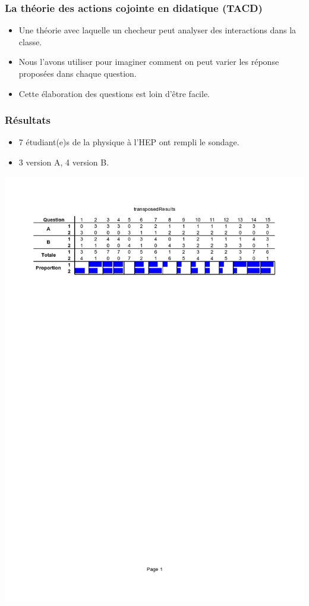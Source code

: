 \documentclass{beamer}
\begin{document}
\begin{frame}
  \frametitle{La théorie des actions cojointe en didatique (TACD)}
  \begin{itemize}
    \item Une théorie avec laquelle un checheur peut analyser des interactions
      dans la classe.
    \item Nous l'avons utiliser pour imaginer comment on peut varier
      les réponse proposées dans chaque question.
      \item Cette élaboration des questions est loin d'être facile.
    \end{itemize}
\end{frame}

\begin{frame}
  \frametitle{Résultats}
  \begin{itemize}
  \item 7 étudiant(e)s de la physique à l'HEP ont rempli le sondage.
    \item 3 version A, 4 version B.
    \end{itemize}

  \begin{center}
\hspace*{-1.5cm}\includegraphics[scale=0.5]{transposedResults}%
\end{center}
  \end{frame}
\end{document}
